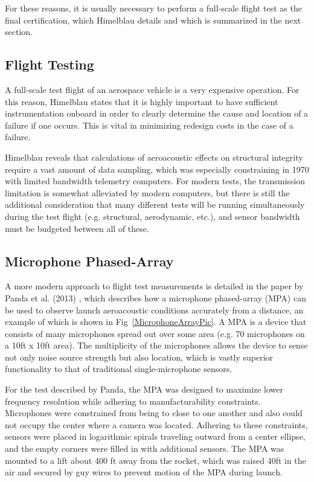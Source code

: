 \documentclass[]{aiaa-tc}%
\begin{document}
For these reasons, it is usually necessary to perform a full-scale flight test as the final certification, which Himelblau details and which is summarized in the next section.

\subsection{Flight Testing}

A full-scale test flight of an aerospace vehicle is a very expensive operation.  For this reason, Himelblau states that it is highly important to have sufficient instrumentation onboard in order to clearly determine the cause and location of a failure if one occurs.  This is vital in minimizing redesign costs in the case of a failure.

Himelblau reveals that calculations of aeroacoustic effects on structural integrity require a vast amount of data sampling, which was especially constraining in 1970 with limited bandwidth telemetry computers.  For modern tests, the transmission limitation is somewhat alleviated by modern computers, but there is still the additional consideration that many different tests will be running simultaneously during the test flight (e.g. structural, aerodynamic, etc.), and sensor bandwidth must be budgeted between all of these.


\subsection{Microphone Phased-Array}

A more modern approach to flight test measurements is detailed in the paper by Panda et al. (2013) \cite{MicrophonePhasedArray}, which describes how a microphone phased-array (MPA) can be used to observe launch aeroacoustic conditions accurately from a distance, an example of which is shown in Fig~\ref{MicrophoneArrayPic}.  A MPA is a device that consists of many microphones spread out over some area (e.g. 70 microphones on a 10ft x 10ft area).  The multiplicity of the microphones allows the device to sense not only noise source strength but also location, which is vastly superior functionality to that of traditional single-microphone sensors.

For the test described by Panda, the MPA was designed to maximize lower frequency resolution while adhering to manufacturability constraints.  Microphones were constrained from being to close to one another and also could not occupy the center where a camera was located.  Adhering to these constraints, sensors were placed in logarithmic spirals traveling outward from a center ellipse, and the empty corners were filled in with additional sensors.  The MPA was mounted to a lift about 400 ft away from the rocket, which was raised 40ft in the air and secured by guy wires to prevent motion of the MPA during launch.
\end{document}
